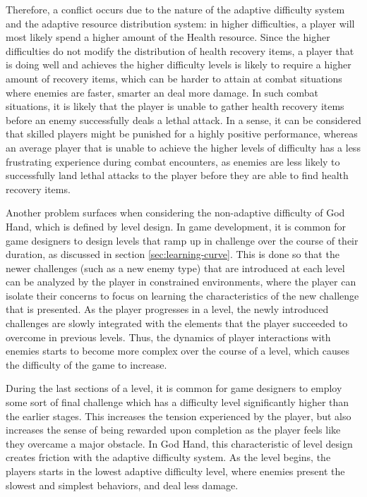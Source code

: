 Therefore, a conflict occurs due to the nature of the adaptive difficulty system and the adaptive resource distribution system: in higher difficulties, a player will most likely spend a higher amount of the Health resource. Since the higher difficulties do not modify the distribution of health recovery items, a player that is doing well and achieves the higher difficulty levels is likely to require a higher amount of recovery items, which can be harder to attain at combat situations where enemies are faster, smarter an deal more damage. In such combat situations, it is likely that the player is unable to gather health recovery items before an enemy successfully deals a lethal attack. In a sense, it can be considered that skilled players might be punished for a highly positive performance, whereas an average player that is unable to achieve the higher levels of difficulty has a less frustrating experience during combat encounters, as enemies are less likely to successfully land lethal attacks to the player before they are able to find health recovery items.

Another problem surfaces when considering the non-adaptive difficulty of God Hand, which is defined by level design. In game development, it is common for game designers to design levels that ramp up in challenge over the course of their duration, as discussed in section \ref{sec:learning-curve}. This is done so that the newer challenges (such as a new enemy type) that are introduced at each level can be analyzed by the player in constrained environments, where the player can isolate their concerns to focus on learning the characteristics of the new challenge that is presented. As the player progresses in a level, the newly introduced challenges are slowly integrated with the elements that the player succeeded to overcome in previous levels. Thus, the dynamics of player interactions with enemies starts to become more complex over the course of a level, which causes the difficulty of the game to increase.

During the last sections of a level, it is common for game designers to employ some sort of final challenge which has a difficulty level significantly higher than the earlier stages. This increases the tension experienced by the player, but also increases the sense of being rewarded upon completion as the player feels like they overcame a major obstacle. In God Hand, this characteristic of level design creates friction with the adaptive difficulty system. As the level begins, the players starts in the lowest adaptive difficulty level, where enemies present the slowest and simplest behaviors, and deal less damage.

